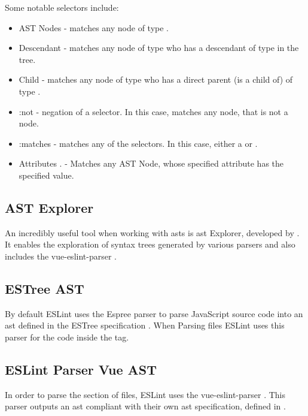 Some notable selectors include:
\begin{itemize}
  \item AST Nodes  - matches any node of type .
  \item Descendant  - matches any node of type  who has a descendant of type  in the tree.
  \item Child   - matches any node of type  who has a direct parent (is a child of) of type .
  \item :not  - negation of a selector. In this case, matches any node, that is not a  node.
  \item :matches -  matches any of the selectors. In this case, either a  or .
  \item Attributes . - Matches any AST Node, whose specified attribute has the specified value.
\end{itemize}

\subsection{AST Explorer}
An incredibly useful tool when working with \glspl{ast} is \gls{ast} Explorer, developed by \textcite{astexplorer_fkling2021Jan}. It enables the exploration of syntax trees generated by various parsers and also includes the vue-eslint-parser \parencite{eslint_vue_parser}.

\subsection{ESTree AST}
By default ESLint uses the Espree \parencite{eslintEspree} parser to parse JavaScript source code into an \gls{ast} defined in the ESTree specification \parencite{estreeASTSpec}. When Parsing  files ESLint uses this parser for the code inside the  tag.
  
\subsection{ESLint Parser Vue AST}

In order to parse the  section of  files, ESLint uses the vue-eslint-parser \parencite{eslint_vue_parser}. This parser outputs an  \gls{ast} compliant with their own \gls{ast} specification, defined in \parencite{eslint_vue_parser_ast}.